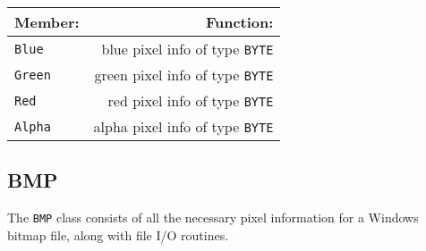 \documentclass[12pt]{article}
\begin{document}
\begin{center}
\begin{tabular}{l | r}
Member: &  Function: \\
\hline 
\texttt{Blue} & blue pixel info of type \texttt{BYTE}\\
\texttt{Green} & green pixel info of type \texttt{BYTE}\\
\texttt{Red} & red pixel info of type \texttt{BYTE}\\
\texttt{Alpha} & alpha pixel info of type \texttt{BYTE}
\end{tabular}
\end{center}

\subsection{BMP}
The \texttt{BMP} class consists of all the necessary pixel information 
for a Windows bitmap file, along with file I/O routines. 
\end{document}
